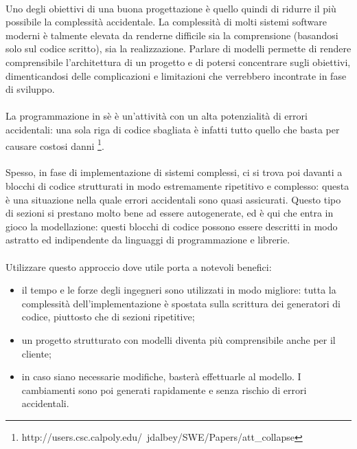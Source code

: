 \documentclass[a4paper, 12pt]{report}
\begin{document}
      \paragraph*{}
      Uno degli obiettivi di una buona progettazione è quello quindi di ridurre il più possibile la complessità accidentale.
      La complessità di molti sistemi software moderni è talmente elevata da renderne difficile sia la comprensione (basandosi solo sul codice scritto), sia la realizzazione.
      Parlare di modelli permette di rendere comprensibile l'architettura di un progetto e di potersi concentrare sugli obiettivi, dimenticandosi delle complicazioni e limitazioni che verrebbero incontrate in fase di sviluppo.
      \paragraph*{}
      La programmazione in sè è un'attività con un alta potenzialità di errori accidentali: una sola riga di codice sbagliata è infatti tutto quello che basta per causare costosi danni \footnote{http://users.csc.calpoly.edu/~jdalbey/SWE/Papers/att_collapse}.
      \paragraph*{}
      Spesso, in fase di implementazione di sistemi complessi, ci si trova poi davanti a blocchi di codice strutturati in modo estremamente ripetitivo e complesso: questa è una situazione nella quale errori accidentali sono quasi assicurati.
      Questo tipo di sezioni si prestano molto bene ad essere autogenerate, ed è qui che entra in gioco la modellazione: questi blocchi di codice possono essere descritti in modo astratto ed indipendente da linguaggi di programmazione e librerie.
      \paragraph*{}
      Utilizzare questo approccio dove utile porta a notevoli benefici:
      \begin{itemize}
        \item il tempo e le forze degli ingegneri sono utilizzati in modo migliore: tutta la complessità dell'implementazione è spostata sulla scrittura dei generatori di codice, piuttosto che di sezioni ripetitive;
        \item un progetto strutturato con modelli diventa più comprensibile anche per il cliente;
        \item in caso siano necessarie modifiche, basterà effettuarle al modello. I cambiamenti sono poi generati rapidamente e senza rischio di errori accidentali.
      \end{itemize}
    \newpage
\end{document}
